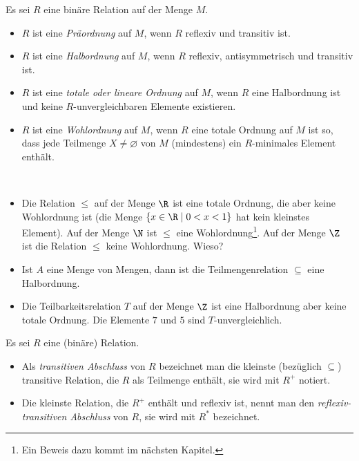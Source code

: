 \begin{df}
Es sei $R$ eine binäre Relation auf der Menge $M$.
\begin{itemize}
\item $R$ ist eine \textit{Präordnung} auf $M$, wenn $R$ reflexiv und transitiv ist.
\item $R$ ist eine \textit{Halbordnung} auf $M$, wenn $R$ reflexiv, antisymmetrisch und transitiv ist.
\item $R$ ist eine \textit{totale oder lineare Ordnung} auf $M$, wenn $R$ eine Halbordnung ist und keine $R$-unvergleichbaren Elemente existieren.
\item $R$ ist eine \textit{Wohlordnung} auf $M$, wenn $R$ eine totale Ordnung auf $M$ ist so, dass jede Teilmenge $X\neq\varnothing$ von $M$ (mindestens) ein $R$-minimales Element enthält.
\end{itemize}
\end{df}


\begin{bsp}~
\begin{itemize}
\item Die Relation $\leq$ auf der Menge $\R$ ist eine totale Ordnung, die aber keine Wohlordnung ist (die Menge $\{x\in\R\mid 0<x<1\}$ hat kein kleinstes Element). Auf der Menge $\N$ ist $\leq$ eine Wohlordnung\footnote{Ein Beweis dazu kommt im nächsten Kapitel.}. Auf der Menge $\Z$ ist die Relation $\leq$ keine Wohlordnung. Wieso?
\item Ist $A$ eine Menge von Mengen, dann ist die Teilmengenrelation $\subseteq$ eine Halbordnung.
\item Die Teilbarkeitsrelation $T$ auf der Menge $\Z$ ist eine Halbordnung aber keine totale Ordnung. Die Elemente $7$ und $5$ sind $T$-unvergleichlich.
\end{itemize}
\end{bsp}

\begin{df}
    Es sei $R$ eine (binäre) Relation.
    \begin{itemize}
        \item Als \textit{transitiven Abschluss} von $R$ bezeichnet man die kleinste
        (bezüglich $\subseteq$) transitive Relation, die $R$ als Teilmenge enthält,
        sie wird mit $R^+$ notiert.
        \item Die kleinste Relation, die $R^+$ enthält und reflexiv ist, nennt man den
        \textit{reflexiv-transitiven Abschluss} von $R$, sie wird mit $R^*$ bezeichnet.
    \end{itemize}
\end{df}


